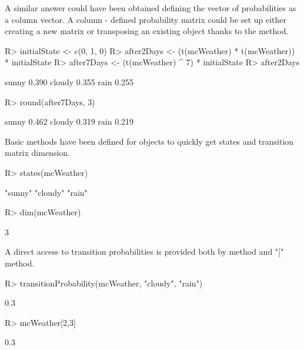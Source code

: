 \documentclass[nojss]{jss}
\begin{document}
A similar answer could have been obtained defining the vector of probabilities as a column vector. A column - defined probability matrix could be set up either creating a new matrix or transposing an existing  object thanks to the  method.

\begin{Schunk}
\begin{Sinput}
R> initialState <- c(0, 1, 0)
R> after2Days <- (t(mcWeather) * t(mcWeather)) * initialState
R> after7Days <- (t(mcWeather) ^ 7) * initialState
R> after2Days
\end{Sinput}
\begin{Soutput}
        [,1]
sunny  0.390
cloudy 0.355
rain   0.255
\end{Soutput}
\begin{Sinput}
R> round(after7Days, 3)
\end{Sinput}
\begin{Soutput}
        [,1]
sunny  0.462
cloudy 0.319
rain   0.219
\end{Soutput}
\end{Schunk}

Basic methods have been defined for  objects to
quickly get states and transition matrix dimension.

\begin{Schunk}
\begin{Sinput}
R> states(mcWeather)
\end{Sinput}
\begin{Soutput}
[1] "sunny"  "cloudy" "rain"  
\end{Soutput}
\begin{Sinput}
R> dim(mcWeather)
\end{Sinput}
\begin{Soutput}
[1] 3
\end{Soutput}
\end{Schunk}

A direct access to transition probabilities is provided both by  method and "[" method.

\begin{Schunk}
\begin{Sinput}
R> transitionProbability(mcWeather, "cloudy", "rain")
\end{Sinput}
\begin{Soutput}
[1] 0.3
\end{Soutput}
\begin{Sinput}
R> mcWeather[2,3]
\end{Sinput}
\begin{Soutput}
[1] 0.3
\end{Soutput}
\end{Schunk}
\end{document}
